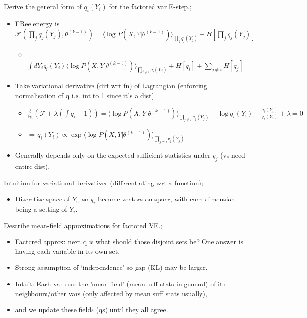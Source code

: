 \documentclass{article}
\begin{document}
Derive the general form of $q_i(Y_i)$ for the factored var E-step.; \begin{itemize}
	\item FRee energy is $\mathcal{F}(\prod_j q_j(Y_j),\theta^{(k-1)}) = \langle \log P(X,Y|\theta^{(k-1)})\rangle_{\prod_j q_j(Y_j)} +H[\prod_jq_j(Y_j)]$
	\begin{itemize}
		\item = $\int dY_i q_i(Y_i)  \langle \log P(X,Y|\theta^{(k-1)})\rangle_{\prod_{j\ne i} q_j(Y_j)} +H[q_i] +\sum_{j\ne i}H[q_j]$
	\end{itemize}
	\item Take variational derivative (diff wrt fn) of Lagrangian (enforcing normalisation of q i.e. int to 1 since it's a dist)
	\begin{itemize}
		\item $\frac{\delta}{\delta q_i} (\mathcal{F}+\lambda (\int q_i - 1)) =  \langle \log P(X,Y|\theta^{(k-1)})\rangle_{\prod_{j\ne i} q_j(Y_j)}- \log q_i(Y_i) - \frac{q_i(Y_i)}{q_i(Y_i)}+\lambda = 0$
		\item $\Rightarrow q_i(Y_i) \propto \exp  \langle \log P(X,Y|\theta^{(k-1)})\rangle_{\prod_{j\ne i} q_j(Y_j)}$
	\end{itemize}
	\item Generally depends only on the expected sufficient statistics under $q_j$ (vs need entire dist). 
\end{itemize}

Intuition for variational derivatives (differentiating wrt a function); \begin{itemize}
	\item Discretise space of $Y_i$, so $q_i$ become vectors on space, with each dimension being a setting of $Y_i$.
\end{itemize}

Describe mean-field approximations for factored VE.; \begin{itemize}
	\item Factored approx: next q is what should those disjoint sets be? One answer is having each variable in its own set. 
	\item Strong assumption of `independence' so gap (KL) may be larger.
	\item Intuit: Each var sees the 'mean field' (mean suff stats in general) of its neighbours/other vars (only affected by mean suff stats usually),
	\item and we update these fields (qs) until they all agree.
\end{itemize}
\end{document}
